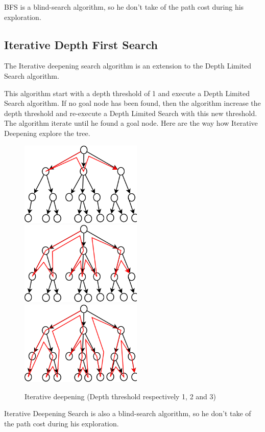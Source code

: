 BFS is a blind-search algorithm, so he don't take of the path cost during his exploration.

  \subsection{Iterative Depth First Search}

The Iterative deepening search algorithm is an extension to the Depth Limited Search algorithm.

This algorithm start with a depth threshold of 1 and execute a Depth Limited Search algorithm. If no goal node has been found, then the algorithm increase the depth threshold and re-execute a Depth Limited Search with this new threshold. The algorithm iterate until he found a goal node. Here are the way how Iterative Deepening explore the tree.

\begin{figure}[h!]
  \centering
  \includegraphics[height=4cm]{img/Ite_explo1.png}
  \includegraphics[height=4cm]{img/Ite_explo2.png}
  \includegraphics[height=4cm]{img/Ite_explo3.png}
  \caption{Iterative deepening (Depth threshold respectively 1, 2 and 3)}
\end{figure} 

Iterative Deepening Search is also a blind-search algorithm, so he don't take of the path cost during his exploration.

\clearpage
